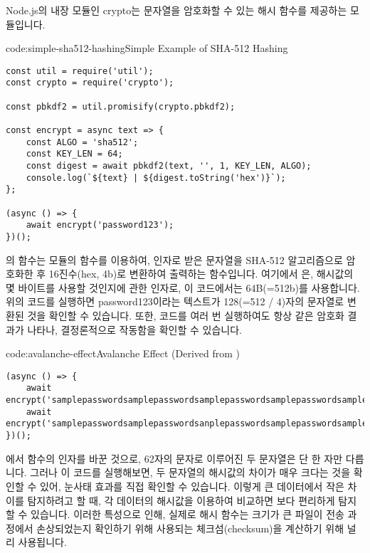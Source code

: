 Node.js의 내장 모듈인 crypto는 문자열을 암호화할 수 있는 해시 함수를 제공하는 모듈입니다.

\begin{codeenv}{code:simple-sha512-hashing}{Simple Example of SHA-512 Hashing}\begin{verbatim}
const util = require('util');
const crypto = require('crypto');

const pbkdf2 = util.promisify(crypto.pbkdf2);

const encrypt = async text => {
    const ALGO = 'sha512';
    const KEY_LEN = 64;
    const digest = await pbkdf2(text, '', 1, KEY_LEN, ALGO);
    console.log(`${text} | ${digest.toString('hex')}`);
};

(async () => {
    await encrypt('password123');
})();
\end{verbatim}
\end{codeenv}

의  함수는  모듈의  함수를 이용하여, 인자로 받은 문자열을 SHA-512 알고리즘으로 암호화한 후 16진수(hex, 4b)로 변환하여 출력하는 함수입니다. 여기에서 은, 해시값의 몇 바이트를 사용할 것인지에 관한 인자로, 이 코드에서는 64B(=512b)를 사용합니다. 위의 코드를 실행하면 password123이라는 텍스트가 128(=512 / 4)자의 문자열로 변환된 것을 확인할 수 있습니다. 또한, 코드를 여러 번 실행하여도 항상 같은 암호화 결과가 나타나, 결정론적으로 작동함을 확인할 수 있습니다.

\begin{codeenv}{code:avalanche-effect}{Avalanche Effect (Derived from )}\begin{verbatim}
(async () => {
    await encrypt('samplepasswordsamplepasswordsamplepasswordsamplepasswordsample');
    await encrypt('samplepasswordsamplepasswordsanplepasswordsamplepasswordsample');
})();
\end{verbatim}
\end{codeenv}

\는 에서  함수의 인자를 바꾼 것으로, 62자의 문자로 이루어진 두 문자열은 단 한 자만 다릅니다. 그러나 이 코드를 실행해보면, 두 문자열의 해시값의 차이가 매우 크다는 것을 확인할 수 있어, 눈사태 효과를 직접 확인할 수 있습니다. 이렇게 큰 데이터에서 작은 차이를 탐지하려고 할 때, 각 데이터의 해시값을 이용하여 비교하면 보다 편리하게 탐지할 수 있습니다. 이러한 특성으로 인해, 실제로 해시 함수는 크기가 큰 파일이 전송 과정에서 손상되었는지 확인하기 위해 사용되는 체크섬(checksum)을 계산하기 위해 널리 사용됩니다.

